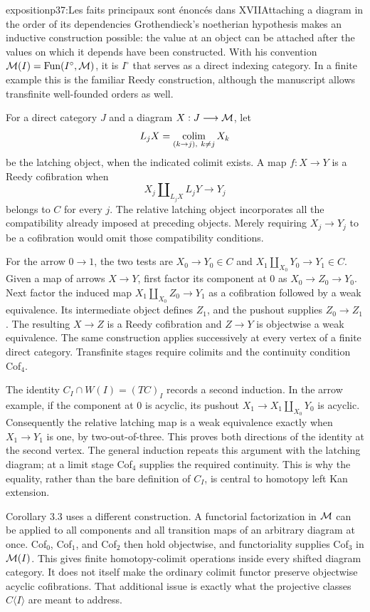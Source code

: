 \begin{dcomment}{exposition}{p37:Les faits principaux sont énoncés dans XVII}{Attaching a diagram in the order of its dependencies}
Grothendieck's noetherian hypothesis makes an inductive construction possible: the value at an object can be attached after the values on which it depends have been constructed. With his convention $\mathcal{M}(I)=\operatorname{Fun}(I^\circ,\mathcal{M})$, it is $I^\circ$ that serves as a direct indexing category. In a finite example this is the familiar Reedy construction, although the manuscript allows transfinite well-founded orders as well.

For a direct category $J$ and a diagram $X:J\longrightarrow\mathcal{M}$, let
\[
 L_jX=\mathop{\rm colim}_{(k\to j),\ k\ne j}X_k
\]
be the latching object, when the indicated colimit exists. A map $f:X\longrightarrow Y$ is a Reedy cofibration when
\[
 X_j\amalg_{L_jX}L_jY\longrightarrow Y_j
\]
belongs to $C$ for every $j$. The relative latching object incorporates all the compatibility already imposed at preceding objects. Merely requiring $X_j\longrightarrow Y_j$ to be a cofibration would omit those compatibility conditions.

For the arrow $0\to1$, the two tests are $X_0\to Y_0\in C$ and
$X_1\amalg_{X_0}Y_0\to Y_1\in C$. Given a map of arrows $X\to Y$, first factor its component at $0$ as $X_0\to Z_0\to Y_0$. Next factor the induced map $X_1\amalg_{X_0}Z_0\to Y_1$ as a cofibration followed by a weak equivalence. Its intermediate object defines $Z_1$, and the pushout supplies $Z_0\to Z_1$. The resulting $X\to Z$ is a Reedy cofibration and $Z\to Y$ is objectwise a weak equivalence. The same construction applies successively at every vertex of a finite direct category. Transfinite stages require colimits and the continuity condition Cof$_4$.

The identity $C_I\cap W(I)=(TC)_I$ records a second induction. In the arrow example, if the component at $0$ is acyclic, its pushout $X_1\to X_1\amalg_{X_0}Y_0$ is acyclic. Consequently the relative latching map is a weak equivalence exactly when $X_1\to Y_1$ is one, by two-out-of-three. This proves both directions of the identity at the second vertex. The general induction repeats this argument with the latching diagram; at a limit stage Cof$_4$ supplies the required continuity. This is why the equality, rather than the bare definition of $C_I$, is central to homotopy left Kan extension.

Corollary 3.3 uses a different construction. A functorial factorization in $\mathcal{M}$ can be applied to all components and all transition maps of an arbitrary diagram at once. Cof$_0$, Cof$_1$, and Cof$_2$ then hold objectwise, and functoriality supplies Cof$_3$ in $\mathcal{M}(I)$. This gives finite homotopy-colimit operations inside every shifted diagram category. It does not itself make the ordinary colimit functor preserve objectwise acyclic cofibrations. That additional issue is exactly what the projective classes $C\langle I\rangle$ are meant to address.
\end{dcomment}


